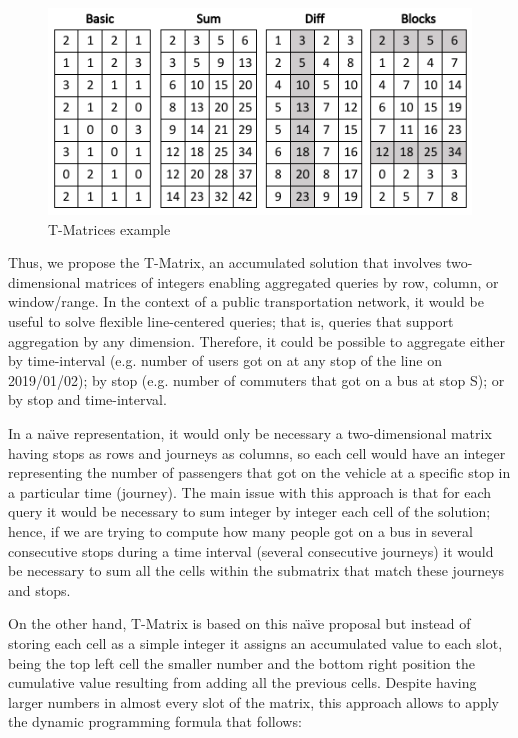 \documentclass[runningheads]{llncs}
\begin{document}
\begin{figure}[h!]
  \includegraphics[scale=0.65]{Tmatrices.png}
  \caption{T-Matrices example}
  \label{fig:tmatrix}
\end{figure}

Thus, we propose the T-Matrix, an accumulated solution that involves two-dimensional matrices of integers enabling aggregated queries by row, column, or window/range. In the context of a public transportation network, it would be useful to solve flexible line-centered queries; that is, queries that support aggregation by any dimension. Therefore, it could be possible to aggregate either by time-interval (e.g. number of users got on at any stop of the line on 2019/01/02); by stop (e.g. number of commuters that got on a bus at stop S); or by stop and time-interval.

In a na\"{\i}ve representation, it would only be necessary a two-dimensional matrix having stops as rows and journeys as columns, so each cell would have an integer representing the number of passengers that got on the vehicle at a specific stop in a particular time (journey). The main issue with this approach is that for each query it would be necessary to sum integer by integer each cell of the solution; hence, if we are trying to compute how many people got on a bus in several consecutive stops during a time interval (several consecutive journeys) it would be necessary to sum all the cells within the submatrix that match these journeys and stops.

On the other hand, T-Matrix is based on this na\"{\i}ve proposal but instead of storing each cell as a simple integer it assigns an accumulated value to each slot, being the top left cell the smaller number and the bottom right position the cumulative value resulting from adding all the previous cells. Despite having larger numbers in almost every slot of the matrix, this approach allows to apply the dynamic programming formula that follows:
\end{document}
